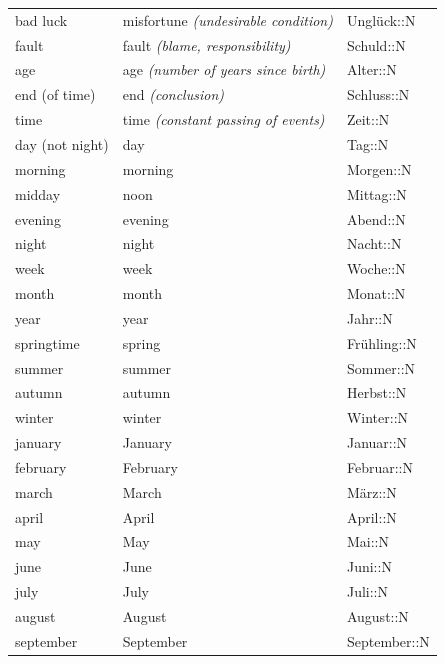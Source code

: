 \begin{center}
\begin{longtable}{lll}
{\sc \lowercase{	BAD LUCK	}}	&	misfortune	\textit{\footnotesize (undesirable condition)}	&	Unglück::N	\\
{\sc \lowercase{	FAULT	}}	&	fault	\textit{\footnotesize (blame, responsibility)}	&	Schuld::N	\\
{\sc \lowercase{	AGE	}}	&	age	\textit{\footnotesize (number of years since birth)}	&	Alter::N	\\
{\sc \lowercase{	END \footnotesize (OF TIME)	}}	&	end	\textit{\footnotesize (conclusion)}	&	Schluss::N	\\
{\sc \lowercase{	TIME	}}	&	time	\textit{\footnotesize (constant passing of events)}	&	Zeit::N	\\
{\sc \lowercase{	DAY \footnotesize (NOT NIGHT)	}}	&	day		&	Tag::N	\\
{\sc \lowercase{	MORNING	}}	&	morning		&	Morgen::N	\\
{\sc \lowercase{	MIDDAY	}}	&	noon		&	Mittag::N	\\
{\sc \lowercase{	EVENING	}}	&	evening		&	Abend::N	\\
{\sc \lowercase{	NIGHT	}}	&	night		&	Nacht::N	\\
{\sc \lowercase{	WEEK	}}	&	week		&	Woche::N	\\
{\sc \lowercase{	MONTH	}}	&	month		&	Monat::N	\\
{\sc \lowercase{	YEAR	}}	&	year		&	Jahr::N	\\
{\sc \lowercase{	SPRINGTIME	}}	&	spring		&	Frühling::N	\\
{\sc \lowercase{	SUMMER	}}	&	summer		&	Sommer::N	\\
{\sc \lowercase{	AUTUMN	}}	&	autumn		&	Herbst::N	\\
{\sc \lowercase{	WINTER	}}	&	winter		&	Winter::N	\\
{\sc \lowercase{	JANUARY	}}	&	January		&	Januar::N	\\
{\sc \lowercase{	FEBRUARY	}}	&	February		&	Februar::N	\\
{\sc \lowercase{	MARCH	}}	&	March		&	März::N	\\
{\sc \lowercase{	APRIL	}}	&	April		&	April::N	\\
{\sc \lowercase{	MAY	}}	&	May		&	Mai::N	\\
{\sc \lowercase{	JUNE	}}	&	June		&	Juni::N	\\
{\sc \lowercase{	JULY	}}	&	July		&	Juli::N	\\
{\sc \lowercase{	AUGUST	}}	&	August		&	August::N	\\
{\sc \lowercase{	SEPTEMBER	}}	&	September		&	September::N	\\

\end{longtable}
\end{center}
